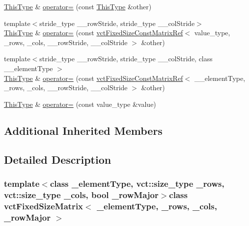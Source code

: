 \begin{DoxyCompactItemize}
\item 
\hyperlink{classvct_fixed_size_const_matrix_base_a7ec66a96ed7e08ce9ff54093133c9d8d}{This\-Type} \& \hyperlink{classvct_fixed_size_matrix_a8e90a51be113cb8f4c938585bb68502d}{operator=} (const \hyperlink{classvct_fixed_size_const_matrix_base_a7ec66a96ed7e08ce9ff54093133c9d8d}{This\-Type} \&other)
\item 
{\footnotesize template$<$stride\-\_\-type \-\_\-\-\_\-row\-Stride, stride\-\_\-type \-\_\-\-\_\-col\-Stride$>$ }\\\hyperlink{classvct_fixed_size_const_matrix_base_a7ec66a96ed7e08ce9ff54093133c9d8d}{This\-Type} \& \hyperlink{classvct_fixed_size_matrix_ab7ba5576b32e4ef485c6c0ea65f85573}{operator=} (const \hyperlink{classvct_fixed_size_const_matrix_ref}{vct\-Fixed\-Size\-Const\-Matrix\-Ref}$<$ value\-\_\-type, \-\_\-rows, \-\_\-cols, \-\_\-\-\_\-row\-Stride, \-\_\-\-\_\-col\-Stride $>$ \&other)
\item 
{\footnotesize template$<$stride\-\_\-type \-\_\-\-\_\-row\-Stride, stride\-\_\-type \-\_\-\-\_\-col\-Stride, class \-\_\-\-\_\-element\-Type $>$ }\\\hyperlink{classvct_fixed_size_const_matrix_base_a7ec66a96ed7e08ce9ff54093133c9d8d}{This\-Type} \& \hyperlink{classvct_fixed_size_matrix_a2bee3fa557c0678e571d4625d51eace1}{operator=} (const \hyperlink{classvct_fixed_size_const_matrix_ref}{vct\-Fixed\-Size\-Const\-Matrix\-Ref}$<$ \-\_\-\-\_\-element\-Type, \-\_\-rows, \-\_\-cols, \-\_\-\-\_\-row\-Stride, \-\_\-\-\_\-col\-Stride $>$ \&other)
\item 
\hyperlink{classvct_fixed_size_const_matrix_base_a7ec66a96ed7e08ce9ff54093133c9d8d}{This\-Type} \& \hyperlink{classvct_fixed_size_matrix_a1e319188c5af6d885a191e290f0e7b40}{operator=} (const value\-\_\-type \&value)
\end{DoxyCompactItemize}
\subsection*{Additional Inherited Members}


\subsection{Detailed Description}
\subsubsection*{template$<$class \-\_\-element\-Type, vct\-::size\-\_\-type \-\_\-rows, vct\-::size\-\_\-type \-\_\-cols, bool \-\_\-row\-Major$>$class vct\-Fixed\-Size\-Matrix$<$ \-\_\-element\-Type, \-\_\-rows, \-\_\-cols, \-\_\-row\-Major $>$}

